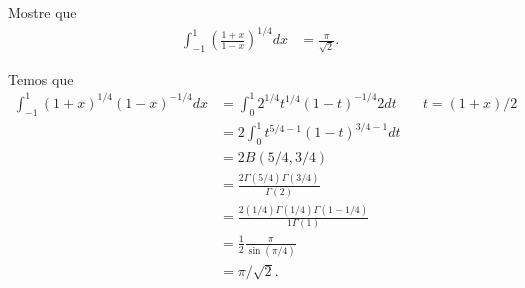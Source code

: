 \documentclass[a4paper,12pt, leqno, answers]{exam}
\begin{document}
\begin{questions}
\begin{solution}
    \end{solution}

    \question[E de 2011] Mostre que
    \begin{align*}
        \int_{-1}^1 \left( \frac{1 + x}{1 - x} \right)^{1/4} dx &= \frac{\pi}{\sqrt{2}}.
    \end{align*}
    \begin{solution}
        Temos que
        \begin{align*}
            \int_{-1}^1 (1 + x)^{1/4} (1 - x)^{-1/4} dx &= \int_0^1 2^{1/4} t^{1/4} (1 - t)^{-1/4} 2 dt && t = (1 + x)/2 \\
            &= 2 \int_0^1 t^{5/4 - 1} (1 - t)^{3/4 - 1} dt \\
            &= 2 B(5/4, 3/4) \\
            &= \frac{2 \Gamma(5/4) \Gamma(3/4)}{\Gamma(2)} \\
            &= \frac{2(1/4) \Gamma(1/4) \Gamma(1 - 1/4)}{1 \Gamma(1)} \\
            &= \frac{1}{2} \frac{\pi}{\sin(\pi/4)} \\
            &= \pi / \sqrt{2}.
        \end{align*}
    \end{solution}
\end{questions}
\end{document}
